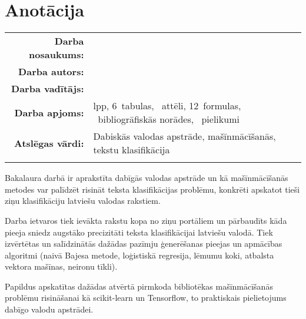 \documentclass{VEA}
\newcounter{nofappendices}
\begin{document}

\tableofcontents
\clearpage


\pagestyle{plain}
\setcounter{page}{4}
\chapter*{Anotācija}

\begin{tabular}{@{}r@{}l@{}}
\parbox[c]{0.3\textwidth}{\textbf{Darba nosaukums:}}&
\parbox[t]{0.65\textwidth}{} \\
\parbox[c]{0.3\textwidth}{\textbf{Darba autors:}}&
\parbox[t]{0.65\textwidth}{} \\
\parbox[c]{0.3\textwidth}{\textbf{Darba vadītājs:}}&
\parbox[t]{0.65\textwidth}{} \\
\parbox[c]{0.3\textwidth}{\textbf{Darba apjoms:}}&
\parbox[t]{0.65\textwidth}{\textcolor{black}{\pageref{LastPage}} lpp, 6~tabulas,  ~attēli, 12~formulas, ~bibliogrāfiskās norādes, ~pielikumi} \\
\parbox[c]{0.3\textwidth}{\textbf{Atslēgas vārdi:}}&
\parbox[t]{0.65\textwidth}{Dabiskās valodas apstrāde, mašīnmācīšanās, tekstu klasifikācija} \\
&\\
\end{tabular}

Bakalaura darbā ir aprakstīta dabīgās valodas apstrāde un kā mašīnmācīšanās metodes var palīdzēt risināt teksta klasifikācijas problēmu, konkrēti apskatot tieši ziņu klasifikāciju latviešu valodas rakstiem.

Darba ietvaros tiek ievākta rakstu kopa no ziņu portāliem un pārbaudīts kāda pieeja sniedz augstāko precizitāti teksta klasifikācijai latviešu valodā. Tiek izvērtētas un salīdzinātās dažādas pazīmju ģenerēšanas pieejas un apmācības algoritmi (naivā Bajesa metode, loģistiskā regresija, lēmumu koki, atbalsta vektora mašīnas, neironu tīkli).

Papildus apskatītas dažādas atvērtā pirmkoda bibliotēkas mašīnmācīšanās problēmu risināšanai kā scikit-learn un Tensorflow, to praktiskais pielietojums dabīgo valodu apstrādei.
\end{document}
